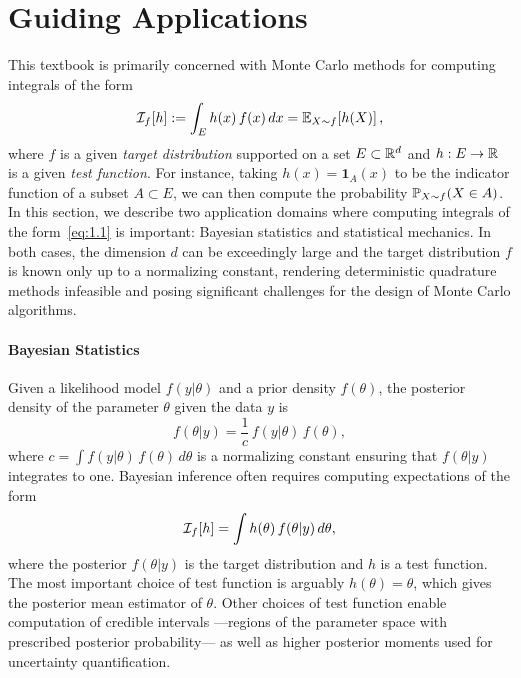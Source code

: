\section{Guiding Applications}
\label{sec:1.2}

This textbook is primarily concerned with Monte Carlo methods for computing integrals of the form
\begin{equation}
  \mathcal{I}_f[h] := \int_E h(x)\,f(x)\,dx = \mathbb{E}_{X \sim f}\!\left[h(X)\right],
  \label{eq:1.1}
\end{equation}
where $f$ is a given \textit{target distribution} supported on a set $E \subset \mathbb{R}^d$ and
$h : E \to \mathbb{R}$ is a given \textit{test function}. For instance, taking $h(x) = \mathbf{1}_A(x)$ to be
the indicator function of a subset $A \subset E$, we can then compute the probability
$\mathbb{P}_{X \sim f}(X \in A)$. In this section, we describe two application domains where computing
integrals of the form~\eqref{eq:1.1} is important: Bayesian statistics and statistical mechanics.
In both cases, the dimension $d$ can be exceedingly large and the target distribution $f$ is known
only up to a normalizing constant, rendering deterministic quadrature methods infeasible and posing
significant challenges for the design of Monte Carlo algorithms.

\paragraph{Bayesian Statistics}
Given a likelihood model $f(y|\theta)$ and a prior density $f(\theta)$, the posterior
density of the parameter $\theta$ given the data $y$ is
\begin{equation}
  f(\theta|y) = \frac{1}{c}\,f(y|\theta)\,f(\theta),
  \label{eq:1.2}
\end{equation}
where $c = \int f(y|\theta)\,f(\theta)\,d\theta$ is a normalizing constant ensuring that $f(\theta|y)$
integrates to one. Bayesian inference often requires computing expectations of the form
\[
  \mathcal{I}_f[h] = \int h(\theta)\,f(\theta|y)\,d\theta,
\]
where the posterior $f(\theta|y)$ is the target distribution and $h$ is a test function. The most
important choice of test function is arguably $h(\theta) = \theta$, which gives the posterior mean
estimator of $\theta$. Other choices of test function enable computation of credible intervals
---regions of the parameter space with prescribed posterior probability--- as well as higher posterior
moments used for uncertainty quantification.

